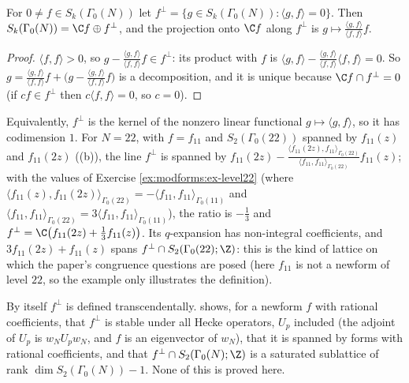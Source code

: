 \begin{proposition}\label{prop:modforms:orthogonal-complement}
For $0\ne f\in S_k(\Gamma_0(N))$ let $f^\perp=\{g\in S_k(\Gamma_0(N)):\langle g,f\rangle=0\}$. Then $S_k(\Gamma_0(N))=\C f\oplus f^\perp$, and the projection onto $\C f$ along $f^\perp$ is
$g\mapsto\frac{\langle g,f\rangle}{\langle f,f\rangle}f$.
\end{proposition}

\begin{proof}
$\langle f,f\rangle>0$, so $g-\frac{\langle g,f\rangle}{\langle f,f\rangle}f\in f^\perp$: its product with $f$ is $\langle g,f\rangle-\frac{\langle g,f\rangle}{\langle f,f\rangle}\langle f,f\rangle=0$. So
$g=\frac{\langle g,f\rangle}{\langle f,f\rangle}f+\bigl(g-\frac{\langle g,f\rangle}{\langle f,f\rangle}f\bigr)$ is a decomposition, and it is unique because $\C f\cap f^\perp=0$ (if $cf\in f^\perp$ then
$c\langle f,f\rangle=0$, so $c=0$).
\end{proof}

Equivalently, $f^\perp$ is the kernel of the nonzero linear functional $g\mapsto\langle g,f\rangle$, so it has codimension $1$. For $N=22$, with $f=f_{11}$ and $S_2(\Gamma_0(22))$
spanned by $f_{11}(z)$ and $f_{11}(2z)$ ((b)), the line $f^\perp$ is spanned by $f_{11}(2z)-\frac{\langle f_{11}(2z),f_{11}\rangle_{\Gamma_0(22)}}{\langle f_{11},f_{11}\rangle_{\Gamma_0(22)}}f_{11}(z)$; with the
values of Exercise \ref{ex:modforms:ex-level22} (where $\langle f_{11}(z),f_{11}(2z)\rangle_{\Gamma_0(22)}=-\langle f_{11},f_{11}\rangle_{\Gamma_0(11)}$ and $\langle f_{11},f_{11}\rangle_{\Gamma_0(22)}=3\langle f_{11},f_{11}\rangle_{\Gamma_0(11)}$),
the ratio is $-\frac13$ and $f^\perp=\C\bigl(f_{11}(2z)+\frac13f_{11}(z)\bigr)$. Its $q$-expansion has non-integral coefficients, and $3f_{11}(2z)+f_{11}(z)$ spans $f^\perp\cap S_2(\Gamma_0(22);\Z)$:
this is the kind of lattice on which the paper's congruence questions are posed (here $f_{11}$ is not a newform of level $22$, so the example only illustrates the definition).

By itself $f^\perp$ is defined transcendentally.  shows, for a newform $f$ with rational coefficients, that $f^\perp$ is stable under all Hecke operators,
$U_p$ included (the adjoint of $U_p$ is $w_NU_pw_N$, and $f$ is an eigenvector of $w_N$), that it is spanned by forms with rational coefficients, and that
$f^\perp\cap S_2(\Gamma_0(N);\Z)$ is a saturated sublattice of rank $\dim S_2(\Gamma_0(N))-1$. None of this is proved here.

